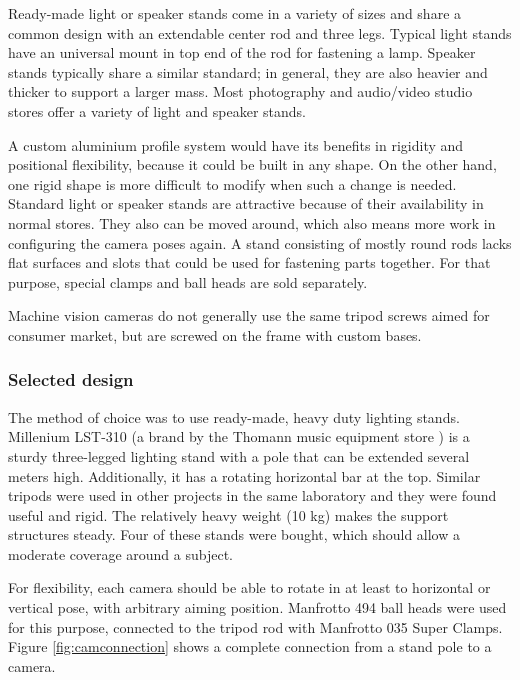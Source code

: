 Ready-made light or speaker stands come in a variety of sizes and share a common design with an extendable center rod and three legs.
Typical light stands have an universal mount in top end of the rod for fastening a lamp.
Speaker stands typically share a similar standard; in general, they are also heavier and thicker to support a larger mass.
Most photography and audio/video studio stores offer a variety of light and speaker stands.

A custom aluminium profile system would have its benefits in rigidity and positional flexibility, because it could be built in any shape.
On the other hand, one rigid shape is more difficult to modify when such a change is needed.
Standard light or speaker stands are attractive because of their availability in normal stores.
They also can be moved around, which also means more work in configuring the camera poses again.
A stand consisting of mostly round rods lacks flat surfaces and slots that could be used for fastening parts together.
For that purpose, special clamps and ball heads are sold separately.

Machine vision cameras do not generally use the same tripod screws aimed for consumer market, but are screwed on the frame with custom bases.

\subsubsection{Selected design}

The method of choice was to use ready-made, heavy duty lighting stands.
Millenium LST-310 (a brand by the Thomann music equipment store \cite{thomann}) is a sturdy three-legged lighting stand with a pole that can be extended several meters high.
Additionally, it has a rotating horizontal bar at the top.
Similar tripods were used in other projects in the same laboratory and they were found useful and rigid.
The relatively heavy weight (10 kg) makes the support structures steady. %
Four of these stands were bought, which should allow a moderate coverage around a subject. %

For flexibility, each camera should be able to rotate in at least to horizontal or vertical pose, with arbitrary aiming position.
Manfrotto 494 ball heads were used for this purpose, connected to the tripod rod with Manfrotto 035 Super Clamps.
Figure \ref{fig:camconnection} shows a complete connection from a stand pole to a camera.


